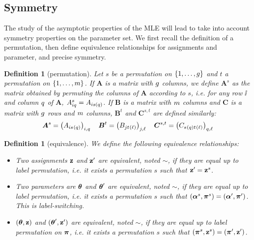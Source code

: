 \documentclass[]{imsart}
\newcommand{\1}{\mathds{1}}
\numberwithin{equation}{section}
\theoremstyle{plain}
\newtheorem{dof}[thm]{Definition}
\theoremstyle{remark}
\newtheorem{rem}[thm]{Remark}
\begin{document}




\subsection{Symmetry}
\label{sec:definitions}
The study of the asymptotic properties of the MLE will lead to take into account symmetry properties on the parameter set. We first recall the definition of a permutation, then define equivalence relationships for assignments and parameter, and  precise symmetry. 

\begin{dof}[permutation]
  \label{def:permutation}
  Let $s$ be a permutation on $\{1,\dots,g\}$ and $t$ a permutation on $\{1,\dots,m\}$. If $\boldsymbol{A}$ is a matrix with $g$ columns, we define $\boldsymbol{A}^s$ as the matrix obtained by permuting the columns of $\boldsymbol{A}$ according to $s$, \emph{i.e.} for any row $\ii$ and column $q$ of $\boldsymbol{A}$, ${A}^s_{i q} = A_{i s(q)}$. If $\boldsymbol{B}$ is a matrix with $m$ columns and $\boldsymbol{C}$ is a matrix with $g$ rows and $m$ columns, $\boldsymbol{B}^t$ and $\boldsymbol{C}^{s,t}$ are defined similarly:
  \begin{equation*}
    \boldsymbol{A}^s = \left( A_{\ii s^{}(\kk)} \right)_{\ii,\kk} \quad  \boldsymbol{B}^t = \left( B_{\jj t^{}(\el)} \right)_{\jj, \el} \quad \boldsymbol{C}^{s,t} = \left( C_{s^{}(\kk) t^{}(\el)} \right)_{\kk,\el}
  \end{equation*}
\end{dof}

\begin{dof}[equivalence]
  \label{def:equivalence}
  We define the following equivalence relationships:
  \begin{itemize}
  \item Two assignments $\mathbf{z}$ and $\mathbf{z}'$ are \emph{equivalent}, noted $\sim$, if they are equal up to label permutation, \emph{i.e.} it exists a permutation $s$ such that $\mathbf{z}' = \mathbf{z}^s$.
  \item Two parameters are $\boldsymbol{\theta}$ and $\boldsymbol{\theta}'$ are \emph{equivalent}, noted $\sim$, if they are equal up to label permutation, \emph{i.e.} it exists a permutation $s$ such that $(\boldsymbol{\alpha}^s,\boldsymbol{\pi}^{s}) = (\boldsymbol{\alpha}', \boldsymbol{\pi}')$. This is \emph{label-switching}.
  \item  $(\boldsymbol{\theta}, \mathbf{z})$ and $(\boldsymbol{\theta}', \mathbf{z}')$ are \emph{equivalent}, noted $\sim$, if they are equal up to label permutation on $\boldsymbol{\pi}$, \emph{i.e.} it exists a permutation $s$ such that $(\boldsymbol{\pi}^{s}, \mathbf{z}^s) = (\boldsymbol{\pi}', \mathbf{z}')$.
  \end{itemize}
\end{dof}
\end{document}
